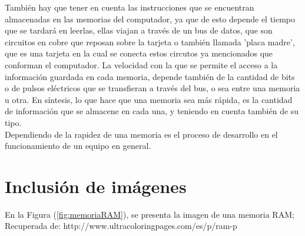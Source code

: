 \documentclass{article}
\begin{document}
\noindent
También hay que tener en cuenta las instrucciones que se encuentran almacenadas en las memorias del computador, ya que de esto depende el tiempo que se tardará en leerlas, ellas viajan a través de un bus de datos, que son circuitos en cobre que reposan sobre la tarjeta o también llamada 'placa madre', que es una tarjeta en la cual se conecta estos circutos ya mencionados que conforman el computador.
La velocidad con la que se permite el acceso a la información guardada en cada memoria, depende también de la cantidad de bits o de pulsos eléctricos que se transfieran a través del bus, o sea entre una memoria u otra.
En síntesis, lo que hace que una memoria sea más rápida, es la cantidad de información que se almacene en cada una, y teniendo en cuenta también de su tipo. \\
\noindent
Dependiendo de la rapidez de una memoria es el proceso de desarrollo en el funcionamiento de un equipo en general.


\section{Inclusión de imágenes} \label{imagenes}

En la Figura (\ref{fig:memoriaRAM}), se presenta la imagen de una memoria RAM;
Recuperada de: http://www.ultracoloringpages.com/es/p/ram-p%


\end{document}
